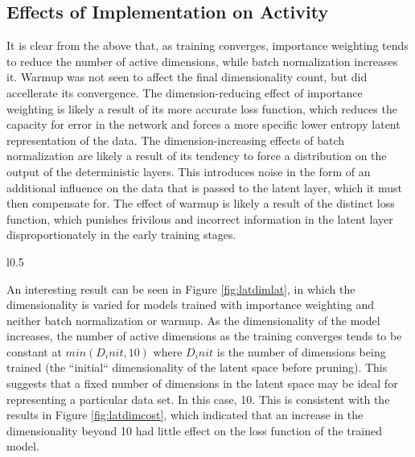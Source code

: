 \documentclass{article} %
\numberwithin{figure}{section}
\begin{document}
\subsection{Effects of Implementation on Activity}
It is clear from the above that, as training converges, importance weighting tends to reduce the number of active dimensions, while batch normalization increases it. Warmup was not seen to affect the final dimensionality count, but did accellerate its convergence. The dimension-reducing effect of importance weighting is likely a result of its more accurate loss function, which reduces the capacity for error in the network and forces a more specific lower entropy latent representation of the data. The dimension-increasing effects of batch normalization are likely a result of its tendency to force a distribution on the output of the deterministic layers. This introduces noise in the form of an additional influence on the data that is passed to the latent layer, which it must then compensate for. The effect of warmup is likely a result of the distinct loss function, which punishes frivilous and incorrect information in the latent layer disproportionately in the early training stages.
\begin{wrapfigure}{l}{0.5\textwidth}
  \resizebox{\linewidth}{!}{}
  \caption{Effect of Latent Dimensionality}
  \label{fig:latdimlat}
\end{wrapfigure}
\par An interesting result can be seen in Figure \ref{fig:latdimlat}, in which the dimensionality is varied for models trained with importance weighting and neither batch normalization or warmup. As the dimensionality of the model increases, the number of active dimensions as the training converges tends to be constant at $min(D_init,10)$ where $D_init$ is the number of dimensions being trained (the ``initial`` dimensionality of the latent space before pruning). This suggests that a fixed number of dimensions in the latent space may be ideal for representing a particular data set. In this case, 10. This is consistent with the results in Figure \ref{fig:latdimcost}, which indicated that an increase in the dimensionality beyond 10 had little effect on the loss function of the trained model.
\end{document}
